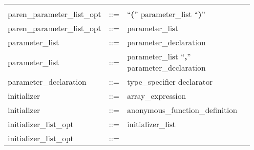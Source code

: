 \documentclass[11pt]{article}
\begin{document}
\begin{longtable}{lrl}
\begin{minipage}[t]{\rulerhs}
  \end{minipage}                                                             \\
paren\_parameter\_list\_opt                & ::= &
  \begin{minipage}[t]{\rulerhs}
    \raggedright
    ``{\bf (}'' parameter\_list ``{\bf )}''
  \end{minipage}                                                             \\
paren\_parameter\_list\_opt                & ::= &
  \begin{minipage}[t]{\rulerhs}
    \raggedright
    parameter\_list
  \end{minipage}                                                             \\
parameter\_list                            & ::= &
  \begin{minipage}[t]{\rulerhs}
    \raggedright
    parameter\_declaration
  \end{minipage}                                                             \\
parameter\_list                            & ::= &
  \begin{minipage}[t]{\rulerhs}
    \raggedright
    parameter\_list ``{\bf ,}'' parameter\_declaration
  \end{minipage}                                                             \\
parameter\_declaration                     & ::= &
  \begin{minipage}[t]{\rulerhs}
    \raggedright
    type\_specifier declarator
  \end{minipage}                                                             \\
initializer                                & ::= &
  \begin{minipage}[t]{\rulerhs}
    \raggedright
    array\_expression
  \end{minipage}                                                             \\
initializer                                & ::= &
  \begin{minipage}[t]{\rulerhs}
    \raggedright
    anonymous\_function\_definition
  \end{minipage}                                                             \\
initializer\_list\_opt                     & ::= &
  \begin{minipage}[t]{\rulerhs}
    \raggedright
    initializer\_list
  \end{minipage}                                                             \\
initializer\_list\_opt                     & ::= &
  \begin{minipage}[t]{\rulerhs}
    \raggedright
    

\end{minipage}
\end{longtable}
\end{document}
